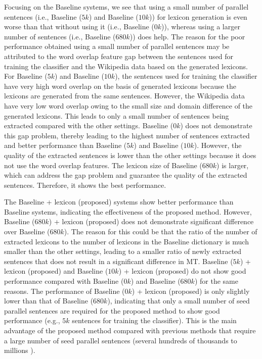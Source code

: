 \documentclass[english]{jnlp_1.4}
\begin{document}
Focusing on the Baseline systems, we see that using a small number of parallel sentences (i.e., 
Baseline ($5k$) and Baseline ($10k$)) for lexicon generation is even worse than that without using 
it (i.e., Baseline ($0k$)), whereas using a larger number of sentences (i.e., Baseline ($680k$)) does 
help. The reason for the poor performance obtained using a small number of parallel sentences may 
be attributed to the word overlap feature gap between the sentences used for training the classifier 
and the Wikipedia data based on the generated lexicons. For Baseline ($5k$) and Baseline ($10k$), the 
sentences used for training the classifier have very high word overlap on the basis of generated 
lexicons because the lexicons are generated from the same sentences. However, the Wikipedia data 
have very low word overlap owing to the small size and domain difference of the generated lexicons. 
This leads to only a small number of sentences being extracted compared with the other settings. 
Baseline ($0k$) does not demonstrate this gap problem, thereby leading to the highest number of sentences 
extracted and better performance than Baseline ($5k$) and Baseline ($10k$). However, the quality of the 
extracted sentences is lower than the other settings because it does not use the word overlap features. 
The lexicon size of Baseline ($680k$) is larger, which can address the gap problem and guarantee the quality 
of the extracted sentences. Therefore, it shows the best performance.

The Baseline + lexicon (proposed) systems show better performance than Baseline systems, indicating 
the effectiveness of the proposed method. However, Baseline ($680k$) + lexicon (proposed) does not 
demonstrate significant difference over Baseline ($680k$). The reason for this could be that the ratio 
of the number of extracted lexicons to the number of lexicons in the Baseline dictionary is much 
smaller than the other settings, leading to a smaller ratio of newly extracted sentences that does 
not result in a significant difference in MT. Baseline ($5k$) + lexicon (proposed) and Baseline ($10k$) 
+ lexicon (proposed) do not show good performance compared with Baseline ($0k$) and Baseline ($680k$) 
for the same reasons. The performance of Baseline ($0k$) + lexicon (proposed) is only slightly lower 
than that of Baseline ($680k$), indicating that only a small number of seed parallel sentences are 
required for the proposed method to show good performance (e.g., $5k$ sentences for training the classifier).
This is the main advantage of the proposed method compared with previous methods that require a 
large number of seed parallel sentences (several hundreds of thousands to millions
\cite{zhao:2002:IEEE,Munteanu:2005,tillmann:2009:Short,smith-quirk-toutanova:2010:NAACLHLT,Abdul-RaufS11,Stefanescu:2012:EAMT,Stefanescu:2013:CICLing,ling-EtAl:2013:ACL2013}).
\end{document}
